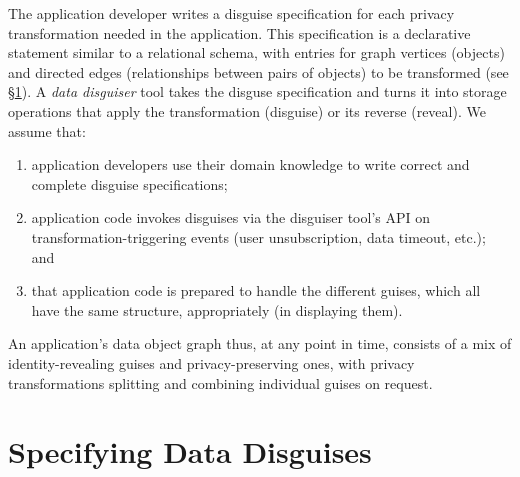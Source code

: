 %
The application developer writes a disguise specification for each privacy transformation needed
in the application.
%
This specification is a declarative statement similar to a relational schema, with entries for
graph vertices (objects) and directed edges (relationships between pairs of objects)
to be transformed (see \S\ref{sec:policies}).
%
A \emph{data disguiser} tool takes the disguse specification and turns it into storage
operations that apply the transformation (disguise) or its reverse (reveal).
%
%
We assume that:
\begin{enumerate}[nosep]
  \item application developers use their domain knowledge to write correct and complete
    disguise specifications;
  \item application code invokes disguises via the disguiser tool's API on
    transformation-triggering events (\eg user unsubscription, data timeout, etc.); and
  \item that application code is prepared to handle the different guises, which all have the
    same structure, appropriately (\eg in displaying them).
\end{enumerate}
%
An application's data object graph thus, at any point in time, consists of a mix of
identity-revealing guises and privacy-preserving ones, with privacy transformations splitting
and combining individual guises on request.
%
%

\section{Specifying Data Disguises}
\label{sec:policies}

